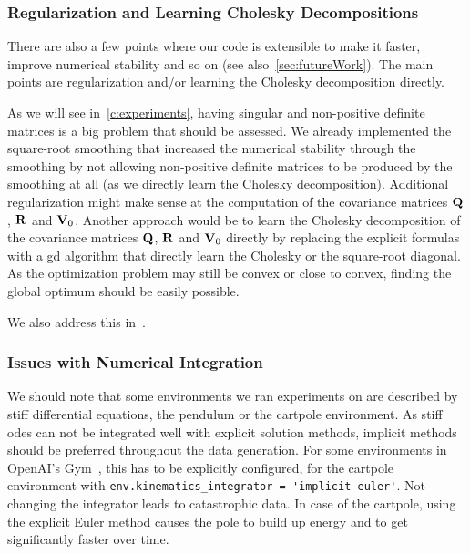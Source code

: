
		\subsubsection{Regularization and Learning Cholesky Decompositions}
			\label{subsubsec:implRegularization}

			There are also a few points where our code is extensible to make it faster, improve numerical stability and so on (see also~\autoref{sec:futureWork}). The main points are regularization and/or learning the Cholesky decomposition directly.

			As we will see in~\autoref{c:experiments}, having singular and non-positive definite matrices is a big problem that should be assessed. We already implemented the square-root smoothing that increased the numerical stability through the smoothing by not allowing non-positive definite matrices to be produced by the smoothing at all (as we directly learn the Cholesky decomposition). Additional regularization might make sense at the computation of the covariance matrices \(\boldsymbol{\mathrm{Q}}\), \(\boldsymbol{\mathrm{R}}\) and \(\boldsymbol{\mathrm{V}}_0\). Another approach would be to learn the Cholesky decomposition of the covariance matrices \(\boldsymbol{\mathrm{Q}}\), \(\boldsymbol{\mathrm{R}}\) and \(\boldsymbol{\mathrm{V}}_0\) directly by replacing the explicit formulas with a \ac{gd} algorithm that directly learn the Cholesky or the square-root diagonal. As the optimization problem may still be convex or close to convex, finding the global optimum should be easily possible.

			We also address this in~.

		\subsubsection{Issues with Numerical Integration}
			\label{subsubsec:integrationProblems}

			We should note that some environments we ran experiments on are described by stiff differential equations, \eg the pendulum or the cartpole environment. As stiff \acp{ode} can not be integrated well with explicit solution methods, implicit methods should be preferred throughout the data generation. For some environments in OpenAI's Gym~\cite{brockmanOpenAIGym2016}, this has to be explicitly configured, \eg for the cartpole environment with \lstinline|env.kinematics_integrator = 'implicit-euler'|. Not changing the integrator leads to catastrophic data. In case of the cartpole, using the explicit Euler method causes the pole to build up energy and to get significantly faster over time.

